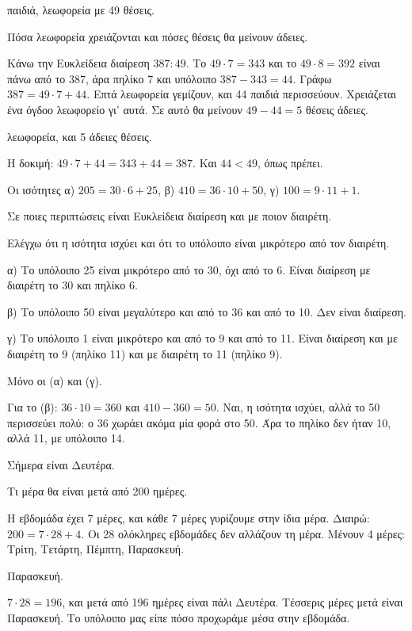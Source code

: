 
 παιδιά, λεωφορεία με 49 θέσεις.\par
\tithelo Πόσα λεωφορεία χρειάζονται και πόσες θέσεις θα μείνουν άδειες.\par
\possindeo Κάνω την Ευκλείδεια διαίρεση $387:49$. Το $49\cdot 7=343$ και το $49\cdot 8=392$ είναι πάνω από το 387, άρα πηλίκο 7 και υπόλοιπο $387-343=44$. Γράφω $387=49\cdot 7+44$. Επτά λεωφορεία γεμίζουν, και 44 παιδιά περισσεύουν. Χρειάζεται ένα όγδοο λεωφορείο γι' αυτά. Σε αυτό θα μείνουν $49-44=5$ θέσεις άδειες.\par
{} λεωφορεία, και 5 άδειες θέσεις.\par
\elegxos Η δοκιμή: $49\cdot 7+44=343+44=387$. Και $44<49$, όπως πρέπει.

\tixero Οι ισότητες α) $205=30\cdot 6+25$, β) $410=36\cdot 10+50$, γ) $100=9\cdot 11+1$.\par
\tithelo Σε ποιες περιπτώσεις είναι Ευκλείδεια διαίρεση και με ποιον διαιρέτη.\par
\possindeo Ελέγχω ότι η ισότητα ισχύει και ότι το υπόλοιπο είναι μικρότερο από τον διαιρέτη.\par
α) Το υπόλοιπο 25 είναι μικρότερο από το 30, όχι από το 6. Είναι διαίρεση με διαιρέτη το 30 και πηλίκο 6.\par
β) Το υπόλοιπο 50 είναι μεγαλύτερο και από το 36 και από το 10. Δεν είναι διαίρεση.\par
γ) Το υπόλοιπο 1 είναι μικρότερο και από το 9 και από το 11. Είναι διαίρεση και με διαιρέτη το 9 (πηλίκο 11) και με διαιρέτη το 11 (πηλίκο 9).\par
\apantisi Μόνο οι (α) και (γ).\par
\elegxos Για το (β): $36\cdot 10=360$ και $410-360=50$. Ναι, η ισότητα ισχύει, αλλά το 50 περισσεύει πολύ: ο 36 χωράει ακόμα μία φορά στο 50. Άρα το πηλίκο δεν ήταν 10, αλλά 11, με υπόλοιπο 14.

\tixero Σήμερα είναι Δευτέρα.\par
\tithelo Τι μέρα θα είναι μετά από 200 ημέρες.\par
\possindeo Η εβδομάδα έχει 7 μέρες, και κάθε 7 μέρες γυρίζουμε στην ίδια μέρα. Διαιρώ: $200=7\cdot 28+4$. Οι 28 ολόκληρες εβδομάδες δεν αλλάζουν τη μέρα. Μένουν 4 μέρες: Τρίτη, Τετάρτη, Πέμπτη, Παρασκευή.\par
\apantisi Παρασκευή.\par
\elegxos $7\cdot 28=196$, και μετά από 196 ημέρες είναι πάλι Δευτέρα. Τέσσερις μέρες μετά είναι Παρασκευή. Το υπόλοιπο μας είπε πόσο προχωράμε μέσα στην εβδομάδα.

